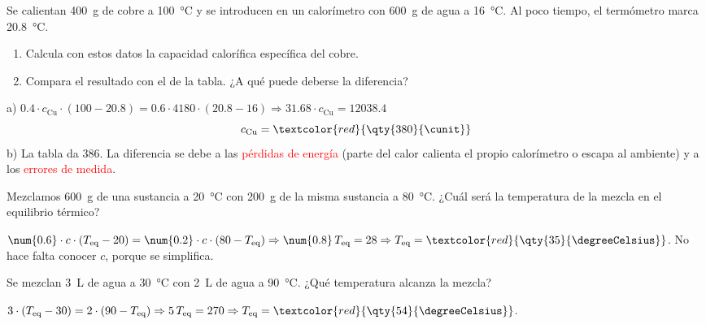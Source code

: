 \begin{exercise}
    Se calientan \qty{400}{\gram} de cobre a \qty{100}{\degreeCelsius} y se introducen en un calorímetro con \qty{600}{\gram} de agua a \qty{16}{\degreeCelsius}. Al poco tiempo, el termómetro marca \qty{20.8}{\degreeCelsius}.
    \begin{enumerate}[label=\alph*)]
        \item Calcula con estos datos la capacidad calorífica específica del cobre.
        \item Compara el resultado con el de la tabla. ¿A qué puede deberse la diferencia?
    \end{enumerate}
    \begin{solu}
        a) \(\num{0.4} \cdot c_{\text{Cu}} \cdot (100 - \num{20.8}) = \num{0.6} \cdot 4180 \cdot (\num{20.8} - 16) \Rightarrow \num{31.68} \cdot c_{\text{Cu}} = \num{12038.4}\)
        \[ c_{\text{Cu}} = \textcolor{red}{\qty{380}{\cunit}} \]
        b) La tabla da \qty{386}{\cunit}. La diferencia se debe a las \textcolor{red}{pérdidas de energía} (parte del calor calienta el propio calorímetro o escapa al ambiente) y a los \textcolor{red}{errores de medida}.
    \end{solu}
\end{exercise}

\begin{exercise}
    Mezclamos \qty{600}{\gram} de una sustancia a \qty{20}{\degreeCelsius} con \qty{200}{\gram} de la misma sustancia a \qty{80}{\degreeCelsius}. ¿Cuál será la temperatura de la mezcla en el equilibrio térmico?
    \begin{solu}
        \(\num{0.6} \cdot c \cdot (T_{\text{eq}} - 20) = \num{0.2} \cdot c \cdot (80 - T_{\text{eq}}) \Rightarrow \num{0.8}\,T_{\text{eq}} = 28 \Rightarrow T_{\text{eq}} = \textcolor{red}{\qty{35}{\degreeCelsius}}\). No hace falta conocer \(c\), porque se simplifica.
    \end{solu}
\end{exercise}

\begin{exercise}
    Se mezclan \qty{3}{\liter} de agua a \qty{30}{\degreeCelsius} con \qty{2}{\liter} de agua a \qty{90}{\degreeCelsius}. ¿Qué temperatura alcanza la mezcla?
    \begin{solu}
        \(3 \cdot (T_{\text{eq}} - 30) = 2 \cdot (90 - T_{\text{eq}}) \Rightarrow 5\,T_{\text{eq}} = 270 \Rightarrow T_{\text{eq}} = \textcolor{red}{\qty{54}{\degreeCelsius}}\).
    \end{solu}
\end{exercise}


